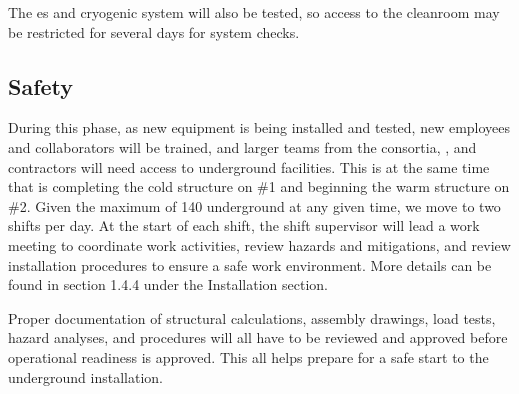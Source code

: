 The \coldbox{}es and cryogenic system will also be tested, so access to the cleanroom  may be restricted for several days for system checks.

\subsection{Safety}
\label{sec:fdsp-tc-infr-safety}
During this phase, as new equipment is being installed and tested, new employees and collaborators will be trained, and larger teams from the consortia, ,  and contractors will need access to underground facilities.  This is at the same time that  is completing the cold structure on  \#1 and beginning the warm structure on   \#2. Given the maximum of 140  underground at any given time, we move to two shifts per day.  At the start of each shift, the shift supervisor will lead a work meeting to coordinate work activities, review hazards and mitigations, and review installation procedures to ensure a safe work environment. More details can be found in section 1.4.4 under the Installation  section. 

Proper documentation of structural calculations, assembly drawings, load tests, hazard analyses, and procedures will all have to be reviewed and approved before operational readiness is approved.  This all helps prepare for a safe start to the underground installation. 

